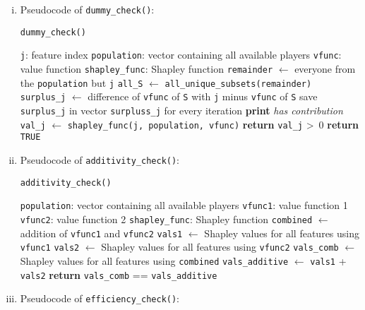{\begin{enumerate}[a)]
\begin{enumerate}[(i)]
	\item Pseudocode of \texttt{dummy\_check()}:
	
	\begin{algorithm}[H]
		\caption{\texttt{dummy\_check()}}
		\begin{algorithmic}[1]
			\Require \texttt{j}: feature index
			\Require \texttt{population}: vector containing all available players
			\Require \texttt{vfunc}: value function
			\Require \texttt{shapley\_func}: Shapley function
			\State \texttt{remainder} $\gets$ everyone from the \texttt{population} but \texttt{j}
			\State \texttt{all\_S} $\gets$ \texttt{all\_unique\_subsets(remainder)}
			\State \texttt{surplus\_j} $\gets$ difference of \texttt{vfunc} of \texttt{S} with \texttt{j} minus \texttt{vfunc} of \texttt{S}
			\State save \texttt{surplus\_j} in vector \texttt{surpluss\_j} for every iteration
			\EndFor
			\State \textbf{print} \textit{has contribution}
			\State \texttt{val\_j} $\gets$ \texttt{shapley\_func(j, population, vfunc)}
			\State \textbf{return} \texttt{val\_j} \textgreater\, 0
			\EndIf
			\State \textbf{return} \texttt{TRUE}
		\end{algorithmic}
	\end{algorithm}

	\item Pseudocode of \texttt{additivity\_check()}:
	
	\begin{algorithm}[H]
		\caption{\texttt{additivity\_check()}}
		\begin{algorithmic}[1]
			\Require \texttt{population}: vector containing all available players
			\Require \texttt{vfunc1}: value function 1
			\Require \texttt{vfunc2}: value function 2
			\Require \texttt{shapley\_func}: Shapley function
			\State \texttt{combined} $\gets$ addition of \texttt{vfunc1} and \texttt{vfunc2}
			\State \texttt{vals1} $\gets$ Shapley values for all features using \texttt{vfunc1}
			\State \texttt{vals2} $\gets$ Shapley values for all features using \texttt{vfunc2}
			\State \texttt{vals\_comb} $\gets$ Shapley values for all features using \texttt{combined}
			\State \texttt{vals\_additive} $\gets$ \texttt{vals1} + \texttt{vals2}
			\State \textbf{return} \texttt{vals\_comb} == \texttt{vals\_additive}
		\end{algorithmic}
	\end{algorithm}

	\item Pseudocode of \texttt{efficiency\_check()}:
	

\end{enumerate}
\end{enumerate}}
